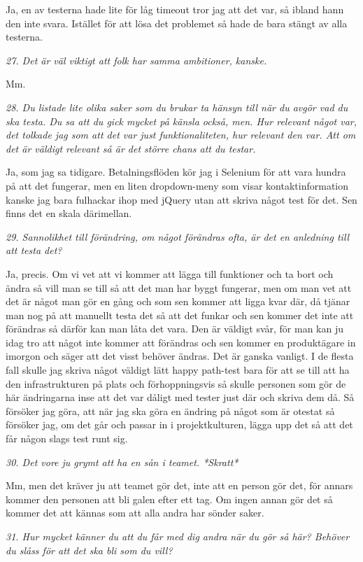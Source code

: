 \documentclass[11pt]{article}
\begin{document}
Ja, en av testerna hade lite för låg timeout tror jag att det var, så ibland hann den inte svara. Istället för att lösa det problemet så hade de bara stängt av alla testerna.

\emph{27. Det är väl viktigt att folk har samma ambitioner, kanske.}

Mm.

\emph{28. Du listade lite olika saker som du brukar ta hänsyn till när du avgör vad du ska testa. Du sa att du gick mycket på känsla också, men. Hur relevant något var, det tolkade jag som att det var just funktionaliteten, hur relevant den var. Att om det är väldigt relevant så är det större chans att du testar.}

Ja, som jag sa tidigare. Betalningsflöden kör jag i Selenium för att vara hundra på att det fungerar, men en liten dropdown-meny som visar kontaktinformation kanske jag bara fulhackar ihop med jQuery utan att skriva något test för det. Sen finns det en skala därimellan.

\emph{29. Sannolikhet till förändring, om något förändras ofta, är det en anledning till att testa det?}

Ja, precis. Om vi vet att vi kommer att lägga till funktioner och ta bort och ändra så vill man se till så att det man har byggt fungerar, men om man vet att det är något man gör en gång och som sen kommer att ligga kvar där, då tjänar man nog på att manuellt testa det så att det funkar och sen kommer det inte att förändras så därför kan man låta det vara. Den är väldigt svår, för man kan ju idag tro att något inte kommer att förändras och sen kommer en produktägare in imorgon och säger att det visst behöver ändras. Det är ganska vanligt. I de flesta fall skulle jag skriva något väldigt lätt happy path-test bara för att se till att ha den infrastrukturen på plats och förhoppningsvis så skulle personen som gör de här ändringarna inse att det var dåligt med tester just där och skriva dem då. Så försöker jag göra, att när jag ska göra en ändring på något som är otestat så försöker jag, om det går och passar in i projektkulturen, lägga upp det så att det får någon slags test runt sig.

\emph{30. Det vore ju grymt att ha en sån i teamet. *Skratt*}

Mm, men det kräver ju att teamet gör det, inte att en person gör det, för annars kommer den personen att bli galen efter ett tag. Om ingen annan gör det så kommer det att kännas som att alla andra har sönder saker.

\emph{31. Hur mycket känner du att du får med dig andra när du gör så här? Behöver du slåss för att det ska bli som du vill?}
\end{document}
